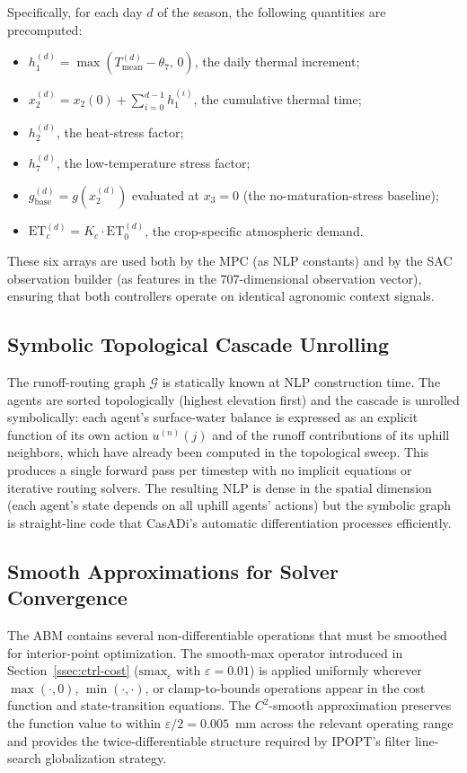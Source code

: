 Specifically, for each day $d$ of the season, the following quantities are
precomputed:
\begin{itemize}
  \item $h_1^{(d)} = \max(T_{\mathrm{mean}}^{(d)} - \theta_7,\, 0)$,
    the daily thermal increment;
  \item $x_2^{(d)} = x_2(0) + \sum_{i=0}^{d-1} h_1^{(i)}$,
    the cumulative thermal time;
  \item $h_2^{(d)}$, the heat-stress factor;
  \item $h_7^{(d)}$, the low-temperature stress factor;
  \item $g_{\mathrm{base}}^{(d)} = g(x_2^{(d)})$ evaluated at
    $x_3 = 0$ (the no-maturation-stress baseline);
  \item $\mathrm{ET}_c^{(d)} = K_c \cdot \mathrm{ET}_0^{(d)}$,
    the crop-specific atmospheric demand.
\end{itemize}
These six arrays are used both by the MPC (as NLP constants) and by the SAC
observation builder (as features in the 707-dimensional observation vector),
ensuring that both controllers operate on identical agronomic context signals.

\subsection{Symbolic Topological Cascade Unrolling}
\label{ssec:ctrl-cascade-unrolling}

The runoff-routing graph $\mathcal{G}$ is statically known at NLP
construction time. The agents are sorted topologically (highest elevation
first) and the cascade is unrolled symbolically: each agent's surface-water
balance is expressed as an explicit function of its own action $u^{(n)}(j)$
and of the runoff contributions of its uphill neighbors, which have already
been computed in the topological sweep. This produces a single forward pass
per timestep with no implicit equations or iterative routing solvers. The
resulting NLP is dense in the spatial dimension (each agent's state depends
on all uphill agents' actions) but the symbolic graph is straight-line code
that CasADi's automatic differentiation processes efficiently.

\subsection{Smooth Approximations for Solver Convergence}
\label{ssec:ctrl-smooth}

The ABM contains several non-differentiable operations that must be smoothed
for interior-point optimization. The smooth-max operator introduced in
Section~\ref{ssec:ctrl-cost} ($\mathrm{smax}_\varepsilon$ with
$\varepsilon = 0.01$) is applied uniformly wherever $\max(\cdot, 0)$,
$\min(\cdot, \cdot)$, or clamp-to-bounds operations appear in the cost
function and state-transition equations. The $C^2$-smooth approximation
preserves the function value to within $\varepsilon/2 = 0.005$~mm across the
relevant operating range and provides the twice-differentiable structure
required by IPOPT's filter line-search globalization strategy.

